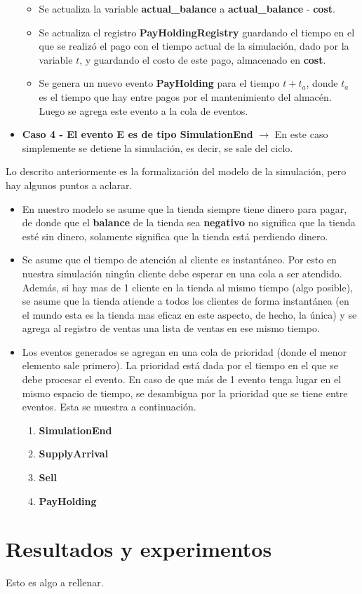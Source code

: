 \documentclass{article}
\begin{document}
\begin{itemize}
\begin{itemize}
        \item Se actualiza la variable \textbf{actual\_balance} a \textbf{actual\_balance} - \textbf{cost}.
        \item Se actualiza el registro \textbf{PayHoldingRegistry} guardando el tiempo en el que se realizó el pago con el tiempo actual de la simulación, dado por la variable $t$, y guardando el costo de este pago, almacenado en \textbf{cost}.
        \item Se genera un nuevo evento \textbf{PayHolding} para el tiempo $t + t_a$, donde $t_a$ es el tiempo que hay entre pagos por el mantenimiento del almacén. Luego se agrega este evento a la cola de eventos.
    \end{itemize}
    \item \textbf{Caso 4 - El evento E es de tipo SimulationEnd} $\to$ En este caso simplemente se detiene la simulación, es decir, se sale del ciclo.
\end{itemize}

Lo descrito anteriormente es la formalización del modelo de la simulación, pero hay algunos puntos a aclarar.
\begin{itemize}
    \item En nuestro modelo se asume que la tienda siempre tiene dinero para pagar, de donde que el \textbf{balance} de la tienda sea \textbf{negativo} no significa que la tienda esté sin dinero, solamente significa que la tienda está perdiendo dinero.
    \item Se asume que el tiempo de atención al cliente es instantáneo. Por esto en nuestra simulación ningún cliente debe esperar en una cola a ser atendido. Además, si hay mas de 1 cliente en la tienda al mismo tiempo (algo posible), se asume que la tienda atiende a todos los clientes de forma instantánea (en el mundo esta es la tienda mas eficaz en este aspecto, de hecho, la única) y se agrega al registro de ventas una lista de ventas en ese mismo tiempo.
    \item Los eventos generados se agregan en una cola de prioridad (donde el menor elemento sale primero). La prioridad está dada por el tiempo en el que se debe procesar el evento. En caso de que más de 1 evento tenga lugar en el mismo espacio de tiempo, se desambigua por la prioridad que se tiene entre eventos. Esta se muestra a continuación.
    \begin{enumerate}
        \item \textbf{SimulationEnd}
        \item \textbf{SupplyArrival}
        \item \textbf{Sell}
        \item \textbf{PayHolding}
    \end{enumerate}
\end{itemize}

\section{Resultados y experimentos}

Esto es algo a rellenar.
\end{document}
